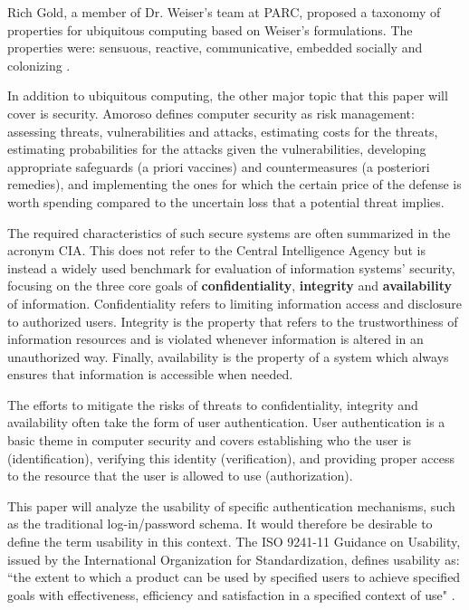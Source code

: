 \documentclass{article}
\begin{document}
Rich Gold, a member of Dr. Weiser's team at PARC, proposed a taxonomy of properties for ubiquitous computing based on Weiser's formulations. The properties were: sensuous, reactive, communicative, embedded socially and colonizing \cite{gold2007plenitude}. 

In addition to ubiquitous computing, the other major topic that this paper will cover is security. Amoroso\cite{amoroso1994fundamentals} defines computer security as risk management: assessing threats, vulnerabilities and attacks, estimating costs for the threats, estimating probabilities for the attacks given the vulnerabilities, developing appropriate safeguards (a priori vaccines) and countermeasures (a posteriori remedies), and implementing the ones for which the certain price of the defense is worth spending compared to the uncertain loss that a potential threat implies. 

The required characteristics of such secure systems are often summarized in the acronym CIA. This does not refer to the Central Intelligence Agency but is instead a widely used benchmark for evaluation of information systems' security, focusing on the three core goals of \textbf{confidentiality}, \textbf{integrity} and \textbf{availability} of information. Confidentiality refers to limiting information access and disclosure to authorized users. Integrity is the property that refers to the trustworthiness of information resources and is violated whenever information is altered in an unauthorized way. Finally, availability is the property of a system which always ensures that information is accessible when needed. 

The efforts to mitigate the risks of threats to confidentiality, integrity and availability often take the form of user authentication. User authentication is a basic theme in computer security and covers establishing who the user is (identification), verifying this identity (verification), and providing proper access to the resource that the user is allowed to use (authorization). 

This paper will analyze the usability of specific authentication mechanisms, such as the traditional log-in/password schema. It would therefore be desirable to define the term usability in this context. The ISO 9241-11 Guidance on Usability, issued by the International Organization for Standardization, defines usability as: ``the extent to which a product can be used by specified users to achieve specified goals with effectiveness, efficiency and satisfaction in a specified context of use" \cite{iso1998international}.
\end{document}

